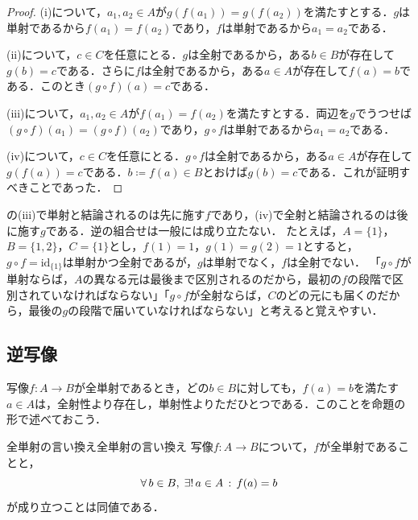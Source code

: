 \begin{tleftbar}
  \begin{proof}
    (i)について，$a_1, a_2 \in A$が$g(f(a_1)) = g(f(a_2))$を満たすとする．$g$は単射であるから$f(a_1) = f(a_2)$であり，$f$は単射であるから$a_1 = a_2$である．

    (ii)について，$c \in C$を任意にとる．$g$は全射であるから，ある$b \in B$が存在して$g(b) = c$である．さらに$f$は全射であるから，ある$a \in A$が存在して$f(a) = b$である．このとき$(g \circ f)(a) = c$である．

    (iii)について，$a_1, a_2 \in A$が$f(a_1) = f(a_2)$を満たすとする．両辺を$g$でうつせば$(g \circ f)(a_1) = (g \circ f)(a_2)$であり，$g \circ f$は単射であるから$a_1 = a_2$である．

    (iv)について，$c \in C$を任意にとる．$g \circ f$は全射であるから，ある$a \in A$が存在して$g(f(a)) = c$である．$b \coloneqq f(a) \in B$とおけば$g(b) = c$である．これが証明すべきことであった．
  \end{proof}
\end{tleftbar}

\begin{remark}
  の(iii)で単射と結論されるのは先に施す$f$であり，(iv)で全射と結論されるのは後に施す$g$である．逆の組合せは一般には成り立たない．
  たとえば，$A = \{1\}$，$B = \{1, 2\}$，$C = \{1\}$とし，$f(1) = 1$，$g(1) = g(2) = 1$とすると，$g \circ f = \mathrm{id}_{\{1\}}$は単射かつ全射であるが，$g$は単射でなく，$f$は全射でない．
  「$g \circ f$が単射ならば，$A$の異なる元は最後まで区別されるのだから，最初の$f$の段階で区別されていなければならない」「$g \circ f$が全射ならば，$C$のどの元にも届くのだから，最後の$g$の段階で届いていなければならない」と考えると覚えやすい．
\end{remark}

\subsection{逆写像}

写像$f \colon A \to B$が全単射であるとき，どの$b \in B$に対しても，$f(a) = b$を満たす$a \in A$は，全射性より存在し，単射性よりただひとつである．このことを命題の形で述べておこう．

\begin{prop}{全単射の言い換え}{全単射の言い換え}
  写像$f \colon A \to B$について，$f$が全単射であることと，
  \[
    \forall\, b \in B ,\; \exists!\, a \in A \,:\, f(a) = b
  \]
  が成り立つことは同値である．
\end{prop}


